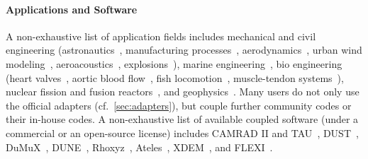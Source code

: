 \paragraph{Applications and Software}
A non-exhaustive list of application fields includes mechanical and civil engineering
(astronautics~\cite{Volland2019}, manufacturing processes~\cite{Seufert2019_COUPLED, scheiblhofer2019coupling}, aerodynamics~\cite{marinoinvestigation, folkersma2020steady, Cocco2020, Risseeuw2019, CINQUEGRANA2021103264, Huang2021_Helicopters, srivastava2019computational}, urban wind modeling~\cite{revell2020coupled}, aeroacoustics~\cite{Lindner2020_ExaFSA, kersschot2020simulation}, explosions~\cite{nguyen2015fluid, zhang2020numerical}), marine engineering~\cite{andrun2020simulating}, bio engineering (heart valves~\cite{Davis2019}, aortic blood flow~\cite{naseri2020scalable}, fish locomotion~\cite{luo2020fluid}, muscle-tendon systems~\cite{Maier2021_Diss}), nuclear fission and fusion reactors~\cite{deSantis2019, fan2020study, Desai2020_Fusion}, and geophysics~\cite{Jaust2020, schmidt2021simulation, geoKW}.
Many users do not only use the official adapters (cf.~\autoref{sec:adapters}), but couple further community codes or their in-house codes. A non-exhaustive list of available coupled software (under a commercial or an open-source license) includes CAMRAD II and TAU~\cite{Huang2021_Helicopters}, DUST~\cite{Cocco2020}, DuMuX~\cite{koch2021dumux, Jaust2020}, DUNE~\cite{Firmbach2021}, Rhoxyz~\cite{andrun2020simulating}, Ateles~\cite{klimach2014end}, XDEM~\cite{besseron2021eulerian}, and FLEXI~\cite{krais2021flexi}. 



